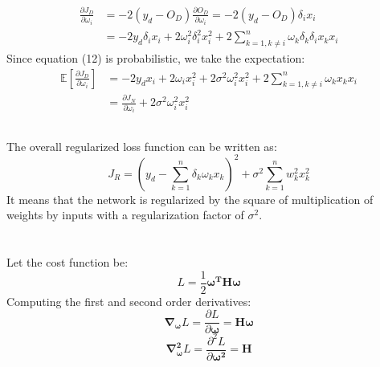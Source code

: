 \documentclass[11pt]{scrartcl} %
\begin{document}
		\begin{equation}
			\begin{aligned}
			\frac{\partial{J_D}}{\partial{\omega_i}} &= 
			-2(y_d - O_D)\frac{\partial{O_D}}{\partial{\omega_i}} =
			-2(y_d - O_D)\delta_i x_i \\
			&= -2y_d \delta_i x_i + 2\omega_i^2 \delta_i^2 x_i^2 + 2\sum_{k=1, k\neq{i}}^n{\omega_k \delta_k \delta_i x_k x_i}
		\end{aligned}
		\end{equation}
		Since equation (12) is probabilistic, we take the expectation:
		\begin{equation}
			\begin{aligned}
				\mathbb{E}[\frac{\partial{J_D}}{\partial{\omega_i}}] &=
				-2y_d x_i +2\omega_i x_i^2 + 2\sigma^2 \omega_i^2 x_i^2 + 2\sum_{k=1, k\neq{i}}^n{\omega_k x_k x_i} \\
				&= \frac{\partial{J_N}}{\partial{\omega_i}} + 2\sigma^2 \omega_i^2 x_i^2
			\end{aligned}
		\end{equation}
		\subsection{}
			The overall regularized loss function can be written as:
			\begin{equation}
				J_R = (y_d- \sum_{k=1}^n{\delta_k\omega_k x_k})^2 + \sigma^2 \sum_{k=1}^n {w_k^2 x_k^2}
			\end{equation}
			It means that the network is regularized by the square of multiplication of weights by inputs
			with a regularization factor of $\sigma^2$.
\section{} %
	Let the cost function be:
	\begin{equation}
		L = \frac{1}{2}\boldsymbol{\omega^T}\boldsymbol{H}\boldsymbol{\omega}
	\end{equation}
	Computing the first and second order derivatives:
	\begin{equation}
		\boldsymbol{\nabla_{\omega}}L = \frac{\partial{L}}{\partial{\boldsymbol{\omega}}} =\boldsymbol{H}\boldsymbol{\omega}
	\end{equation}
	\begin{equation} \label{eq:5.1}
		\boldsymbol{\nabla^2_{\omega}}L =\frac{\partial^2{L}}{\partial{\boldsymbol{\omega^2}}} =\boldsymbol{H}
	\end{equation}
\end{document}
